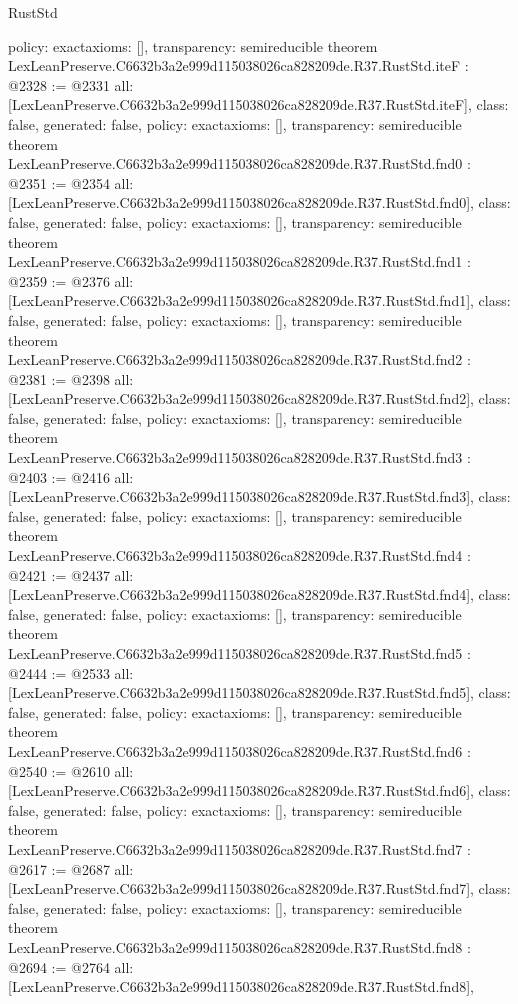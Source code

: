 \begin{lexlean}{RustStd}
\begin{coremodule}
{  policy: exact{axioms: []},
  transparency: semireducible
}
theorem LexLeanPreserve.C6632b3a2e999d115038026ca828209de.R37.RustStd.iteF : @2328 := @2331 {
  all: [LexLeanPreserve.C6632b3a2e999d115038026ca828209de.R37.RustStd.iteF],
  class: false,
  generated: false,
  policy: exact{axioms: []},
  transparency: semireducible
}
theorem LexLeanPreserve.C6632b3a2e999d115038026ca828209de.R37.RustStd.fnd0 : @2351 := @2354 {
  all: [LexLeanPreserve.C6632b3a2e999d115038026ca828209de.R37.RustStd.fnd0],
  class: false,
  generated: false,
  policy: exact{axioms: []},
  transparency: semireducible
}
theorem LexLeanPreserve.C6632b3a2e999d115038026ca828209de.R37.RustStd.fnd1 : @2359 := @2376 {
  all: [LexLeanPreserve.C6632b3a2e999d115038026ca828209de.R37.RustStd.fnd1],
  class: false,
  generated: false,
  policy: exact{axioms: []},
  transparency: semireducible
}
theorem LexLeanPreserve.C6632b3a2e999d115038026ca828209de.R37.RustStd.fnd2 : @2381 := @2398 {
  all: [LexLeanPreserve.C6632b3a2e999d115038026ca828209de.R37.RustStd.fnd2],
  class: false,
  generated: false,
  policy: exact{axioms: []},
  transparency: semireducible
}
theorem LexLeanPreserve.C6632b3a2e999d115038026ca828209de.R37.RustStd.fnd3 : @2403 := @2416 {
  all: [LexLeanPreserve.C6632b3a2e999d115038026ca828209de.R37.RustStd.fnd3],
  class: false,
  generated: false,
  policy: exact{axioms: []},
  transparency: semireducible
}
theorem LexLeanPreserve.C6632b3a2e999d115038026ca828209de.R37.RustStd.fnd4 : @2421 := @2437 {
  all: [LexLeanPreserve.C6632b3a2e999d115038026ca828209de.R37.RustStd.fnd4],
  class: false,
  generated: false,
  policy: exact{axioms: []},
  transparency: semireducible
}
theorem LexLeanPreserve.C6632b3a2e999d115038026ca828209de.R37.RustStd.fnd5 : @2444 := @2533 {
  all: [LexLeanPreserve.C6632b3a2e999d115038026ca828209de.R37.RustStd.fnd5],
  class: false,
  generated: false,
  policy: exact{axioms: []},
  transparency: semireducible
}
theorem LexLeanPreserve.C6632b3a2e999d115038026ca828209de.R37.RustStd.fnd6 : @2540 := @2610 {
  all: [LexLeanPreserve.C6632b3a2e999d115038026ca828209de.R37.RustStd.fnd6],
  class: false,
  generated: false,
  policy: exact{axioms: []},
  transparency: semireducible
}
theorem LexLeanPreserve.C6632b3a2e999d115038026ca828209de.R37.RustStd.fnd7 : @2617 := @2687 {
  all: [LexLeanPreserve.C6632b3a2e999d115038026ca828209de.R37.RustStd.fnd7],
  class: false,
  generated: false,
  policy: exact{axioms: []},
  transparency: semireducible
}
theorem LexLeanPreserve.C6632b3a2e999d115038026ca828209de.R37.RustStd.fnd8 : @2694 := @2764 {
  all: [LexLeanPreserve.C6632b3a2e999d115038026ca828209de.R37.RustStd.fnd8],
}
\end{coremodule}
\end{lexlean}
